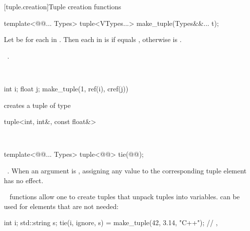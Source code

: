 \documentclass[american,twoside]{book}
\begin{document}
[tuple.creation]{Tuple creation functions}

%
%
\begin{itemdecl}
template<@@... Types>
  tuple<VTypes...> make_tuple(Types&&... t); 
\end{itemdecl}

\begin{itemdescr}
\pnum 
Let \mbox{} be \mbox{} for each \mbox{} in \mbox{}. Then each \mbox{} in \mbox{} is \mbox{} if \mbox{} equals \mbox{}, otherwise \mbox{} is \mbox{}.

\pnum
\returns\ .
 
\pnum
\enterexample\

\begin{codeblock}
int i; float j; 
make_tuple(1, ref(i), cref(j))
\end{codeblock}

creates a tuple of type 

\begin{codeblock}
tuple<int, int&, const float&>
\end{codeblock}

\exitexample\

\end{itemdescr}

%
%
\begin{itemdecl}
template<@@... Types>
  tuple<@@> tie(@@);
\end{itemdecl}

\begin{itemdescr}
\pnum
\returns\  .  When an
argument  is , assigning
any value to the corresponding tuple element has no effect.
 
\pnum
\enterexample\
 functions allow one to create tuples that unpack 
tuples into variables.  can be used for elements that
are not needed:
\begin{codeblock}
int i; std::string s;
tie(i, ignore, s) = make_tuple(42, 3.14, "C++");
// , 
\end{codeblock}
\exitexample\
\end{itemdescr}
\end{document}
